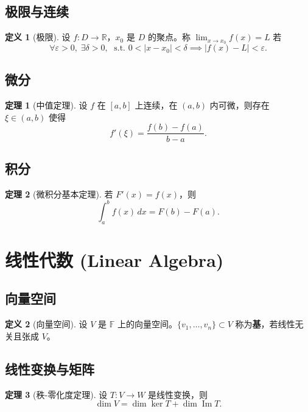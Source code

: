 \documentclass[12pt,a4paper]{article}
\theoremstyle{definition}
\newtheorem{definition}{定义}[section]
\newtheorem{theorem}{定理}[section]
\newcommand{\R}{\mathbb{R}}              %
\newcommand{\F}{\mathbb{F}}              %
\newcommand{\eps}{\varepsilon}           %
\providecommand{\abs}[1]{\left\lvert #1 \right\rvert}
\newcommand{\st}{\text{ s.t. }}         %
\begin{document}
\subsection{极限与连续}
\begin{definition}[极限]
  设 $f: D \to \R$，$x_0$ 是 $D$ 的聚点。称 $\displaystyle\lim_{x\to x_0} f(x) = L$ 若
  \[
  \forall \eps > 0,\; \exists \delta > 0,\; \st 0 < \abs{x - x_0} < \delta \implies \abs{f(x) - L} < \eps.
  \]
\end{definition}

\subsection{微分}
\begin{theorem}[中值定理]
  设 $f$ 在 $[a,b]$ 上连续，在 $(a,b)$ 内可微，则存在 $\xi \in (a,b)$ 使得
  \[
  f'(\xi) = \frac{f(b) - f(a)}{b - a}.
  \]
\end{theorem}

\subsection{积分}
\begin{theorem}[微积分基本定理]
  若 $F'(x) = f(x)$，则
  \[
  \int_a^b f(x)\,dx = F(b) - F(a).
  \]
\end{theorem}

\section{线性代数 (Linear Algebra)}

\subsection{向量空间}
\begin{definition}[向量空间]
  设 $V$ 是 $\F$ 上的向量空间。$\{v_1,\dots,v_n\} \subset V$ 称为\textbf{基}，若线性无关且张成 $V$。
\end{definition}

\subsection{线性变换与矩阵}
\begin{theorem}[秩-零化度定理]
  设 $T: V \to W$ 是线性变换，则
  \[
  \dim V = \dim\ker T + \dim\operatorname{Im} T.
  \]
\end{theorem}
\end{document}

